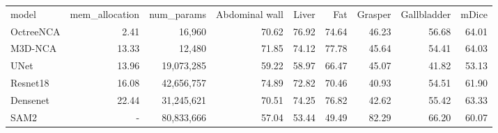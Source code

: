 \begin{tabular}{lrrrrrrrr}
model & mem_allocation & num_params & Abdominal wall & Liver & Fat & Grasper & Gallbladder & mDice \\
OctreeNCA & 2.41 & 16,960 & 70.62 & 76.92 & 74.64 & 46.23 & 56.68 & 64.01 \\
M3D-NCA & 13.33 & 12,480 & 71.85 & 74.12 & 77.78 & 45.64 & 54.41 & 64.03 \\
UNet & 13.96 & 19,073,285 & 59.22 & 58.97 & 66.47 & 45.07 & 41.82 & 53.13 \\
Resnet18 & 16.08 & 42,656,757 & 74.89 & 72.82 & 70.46 & 40.93 & 54.51 & 61.90 \\
Densenet & 22.44 & 31,245,621 & 70.51 & 74.25 & 76.82 & 42.62 & 55.42 & 63.33 \\
SAM2 & - & 80,833,666 & 57.04 & 53.44 & 49.49 & 82.29 & 66.20 & 60.07 \\
\end{tabular}
